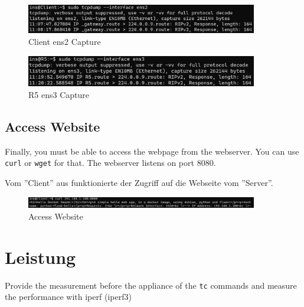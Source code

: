 \documentclass[11pt,titlepage]{article}
\newenvironment{shadedquotation}
 {\begin{shaded*}
  \quoting[leftmargin=0pt, vskip=0pt]
 }
 {\endquoting
 \end{shaded*}
}
\begin{document}
\begin{figure}[H]
	\begin{center}
		\includegraphics[width=0.90\textwidth]{"images/Client OSPF Capture"}
		\caption{Client ens2 Capture}
		\label{fig:client-OSPF-Capture}
	\end{center}
\end{figure}

\begin{figure}[H]
	\begin{center}
		\includegraphics[width=0.90\textwidth]{"images/R5 OSPF Capture"}
		\caption{R5 ens3 Capture}
		\label{fig:client-OSPF-Capture}
	\end{center}
\end{figure}


\subsection{Access Website}
\label{subsec:AccessWebsite}
\begin{shadedquotation}
  Finally, you must be able to access the webpage from the webserver. You can use \lstinline!curl! or \lstinline!wget! for that. The webserver listens on port 8080.
\end{shadedquotation}
Vom ''Client'' aus funktionierte der Zugriff auf die Webseite vom ''Server''.
\begin{figure}[H]
	\begin{center}
		\includegraphics[width=0.90\textwidth]{"images/Verifikation Access Website"}
		\caption{Access Website}
		\label{fig:verifikation-access-website}
	\end{center}
\end{figure}

\section{Leistung}
\label{sec:Leistung}
\begin{shadedquotation}
	Provide the measurement before the appliance of the \lstinline!tc! commands and measure the performance	with iperf (iperf3)
\end{shadedquotation}
\end{document}
